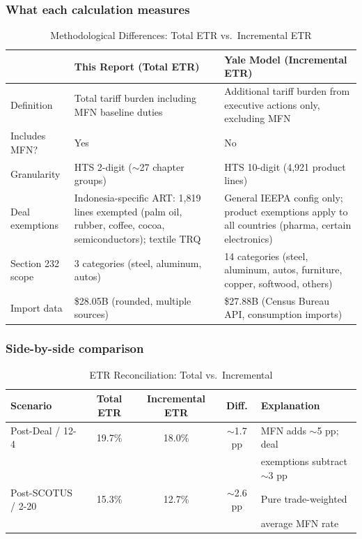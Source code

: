 \documentclass[12pt,a4paper]{article}
\begin{document}
\subsubsection*{What each calculation measures}

\begin{table}[htbp]
\centering
\caption{Methodological Differences: Total ETR vs.\ Incremental ETR}
\small
\begin{tabularx}{\textwidth}{lXX}
\toprule
& \textbf{This Report (Total ETR)} & \textbf{Yale Model (Incremental ETR)} \\
\midrule
Definition & Total tariff burden including MFN baseline duties & Additional tariff burden from executive actions only, excluding MFN \\
Includes MFN? & Yes & No \\
Granularity & HTS 2-digit ($\sim$27 chapter groups) & HTS 10-digit (4,921 product lines) \\
Deal exemptions & Indonesia-specific ART: 1,819 lines exempted (palm oil, rubber, coffee, cocoa, semiconductors); textile TRQ & General IEEPA config only; product exemptions apply to all countries (pharma, certain electronics) \\
Section 232 scope & 3 categories (steel, aluminum, autos) & 14 categories (steel, aluminum, autos, furniture, copper, softwood, others) \\
Import data & \$28.05B (rounded, multiple sources) & \$27.88B (Census Bureau API, consumption imports) \\
\bottomrule
\end{tabularx}
\end{table}

\subsubsection*{Side-by-side comparison}

\begin{table}[htbp]
\centering
\caption{ETR Reconciliation: Total vs.\ Incremental}
\begin{tabular}{lcccl}
\toprule
\textbf{Scenario} & \textbf{Total ETR} & \textbf{Incremental ETR} & \textbf{Diff.} & \textbf{Explanation} \\
\midrule
Post-Deal / 12-4 & 19.7\% & 18.0\% & $\sim$1.7 pp & MFN adds $\sim$5 pp; deal \\
& & & & exemptions subtract $\sim$3 pp \\
Post-SCOTUS / 2-20 & 15.3\% & 12.7\% & $\sim$2.6 pp & Pure trade-weighted \\
& & & & average MFN rate \\
\bottomrule
\end{tabular}
\end{table}
\end{document}

